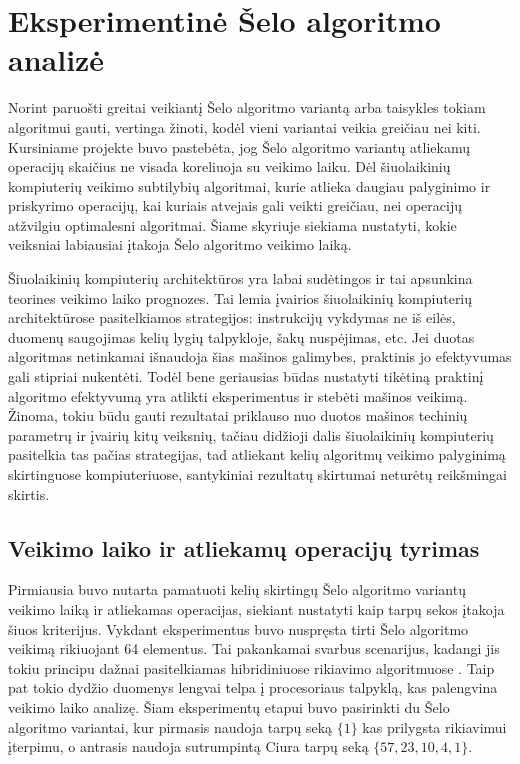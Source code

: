 \documentclass{VUMIFInfBakalaurinis}
\begin{document}
\section{Eksperimentinė Šelo algoritmo analizė}

Norint paruošti greitai veikiantį Šelo algoritmo variantą arba taisykles tokiam algoritmui gauti, vertinga žinoti, kodėl vieni variantai veikia greičiau nei kiti.
Kursiniame projekte buvo pastebėta, jog Šelo algoritmo variantų atliekamų operacijų skaičius ne visada koreliuoja su veikimo laiku.
Dėl šiuolaikinių kompiuterių veikimo subtilybių algoritmai, kurie atlieka daugiau palyginimo ir priskyrimo operacijų,
kai kuriais atvejais gali veikti greičiau, nei operacijų atžvilgiu optimalesni algoritmai.
Šiame skyriuje siekiama nustatyti, kokie veiksniai labiausiai įtakoja Šelo algoritmo veikimo laiką.

Šiuolaikinių kompiuterių architektūros yra labai sudėtingos ir tai apsunkina teorines veikimo laiko prognozes.
Tai lemia įvairios šiuolaikinių kompiuterių architektūrose pasitelkiamos strategijos:
instrukcijų vykdymas ne iš eilės, duomenų saugojimas kelių lygių talpykloje, šakų nuspėjimas, etc.
Jei duotas algoritmas netinkamai išnaudoja šias mašinos galimybes, praktinis jo efektyvumas gali stipriai nukentėti.
Todėl bene geriausias būdas nustatyti tikėtiną praktinį algoritmo efektyvumą yra atlikti eksperimentus ir stebėti mašinos veikimą.
Žinoma, tokiu būdu gauti rezultatai priklauso nuo duotos mašinos techinių parametrų ir įvairių kitų veiksnių, tačiau didžioji dalis
šiuolaikinių kompiuterių pasitelkia tas pačias strategijas, tad atliekant kelių algoritmų veikimo palyginimą skirtinguose kompiuteriuose,
santykiniai rezultatų skirtumai neturėtų reikšmingai skirtis.  

\subsection{Veikimo laiko ir atliekamų operacijų tyrimas}

Pirmiausia buvo nutarta pamatuoti kelių skirtingų Šelo algoritmo variantų veikimo laiką ir atliekamas operacijas, siekiant nustatyti kaip tarpų sekos įtakoja šiuos kriterijus.
Vykdant eksperimentus buvo nuspręsta tirti Šelo algoritmo veikimą rikiuojant 64 elementus.
Tai pakankamai svarbus scenarijus, kadangi jis tokiu principu dažnai pasitelkiamas hibridiniuose rikiavimo algoritmuose \cite{golangsort,bzip2sort}.
Taip pat tokio dydžio duomenys lengvai telpa į procesoriaus talpyklą, kas palengvina veikimo laiko analizę.
Šiam eksperimentų etapui buvo pasirinkti du Šelo algoritmo variantai, kur pirmasis naudoja tarpų seką $\{1\}$ kas prilygsta rikiavimui įterpimu, o antrasis naudoja sutrumpintą Ciura tarpų seką $\{57,23,10,4,1\}$.
\end{document}

